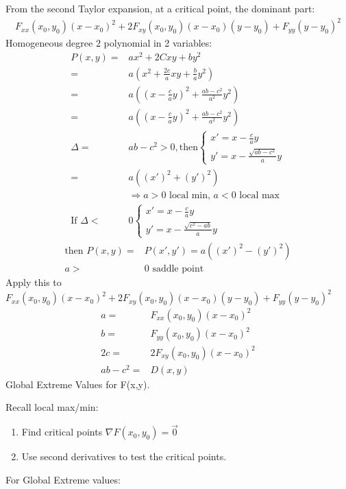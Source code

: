 \documentclass{article}
\begin{document}
        From the second Taylor expansion, at a critical point, the dominant part:
        \begin{align}
            F_{xx}(x_0,y_0)(x-x_0)^2 + 2F_{xy}(x_0,y_0)(x-x_0)(y-y_0)+F_{yy}(y-y_0)^2
        \end{align}
        Homogeneous degree 2 polynomial in 2 variables:
        \begin{align}
            P(x,y) =& ax^2 + 2Cxy + by^2\\
            =&a(x^2 + \frac{2c}{a}xy + \frac{b}{a}y^2)\\
            =&a((x-\frac{c}{a}y)^2 + \frac{ab-c^2}{a^2}y^2)\\
            =&a((x-\frac{c}{a}y)^2 + \frac{ab-c^2}{a^2}y^2)\\
            \Delta =& ab-c^2 > 0, \text{then}\begin{cases}
                x'=x-\frac{c}{a}y\\
                y'=x-\frac{\sqrt{ab-c^2}}{a}y
            \end{cases}\\
            =& a((x')^2 + (y')^2)\\
            &\Rightarrow a > 0 \text{ local min, }a < 0 \text{ local max}\\
            \text{If }\Delta <& 0 \begin{cases}
                x'=x-\frac{c}{a}y\\
                y'=x-\frac{\sqrt{c^2-ab}}{a}y
            \end{cases}
        \end{align}
        \begin{align}
            \text{then } P(x,y) =& P(x', y') = a((x')^2-(y')^2)\\
            a>&0 \text{ saddle point}
        \end{align}
        Apply this to $F_{xx}(x_0,y_0)(x-x_0)^2 + 2F_{xy}(x_0,y_0)(x-x_0)(y-y_0)+F_{yy}(y-y_0)^2$
        \begin{align}
             a =& F_{xx}(x_0,y_0)(x-x_0)^2\\
             b =& F_{yy}(x_0,y_0)(x-x_0)^2\\ 
            2c =& 2F_{xy}(x_0,y_0)(x-x_0)^2\\
            ab-c^2 =& D(x,y)
        \end{align}
        Global Extreme Values for F(x,y).
        
        Recall local max/min:
        \begin{enumerate}
            \item Find critical points $\nabla F(x_0,y_0)=\vec{0}$
            \item Use second derivatives to test the critical points.
        \end{enumerate}
        For Global Extreme values:\\
        
\end{document}
